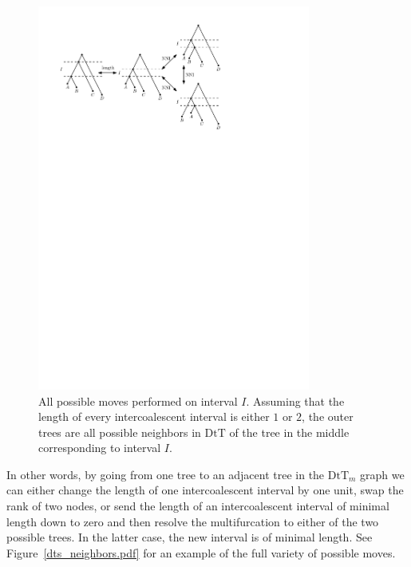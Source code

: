 \documentclass{amsart}
\theoremstyle{definition}
\newcommand{\dtt}{\mathrm{DtT}}
\begin{document}
\begin{figure}[ht]
\centering
\includegraphics[width=0.8\textwidth]{DtT.pdf}
\caption{All possible moves performed on interval $I$.
Assuming that the length of every intercoalescent interval is either $1$ or $2$, the outer trees are all possible neighbors in $\dtt$ of the tree in the middle corresponding to interval $I$.}
\label{DtT.pdf}
\end{figure}

In other words, by going from one tree to an adjacent tree in the $\dtt_m$ graph we can either change the length of one intercoalescent interval by one unit, swap the rank of two nodes, or send the length of an intercoalescent interval of minimal length down to zero and then resolve the multifurcation to either of the two possible trees.
In the latter case, the new interval is of minimal length.
See Figure~\ref{dts_neighbors.pdf} for an example of the full variety of possible moves.
\end{document}
